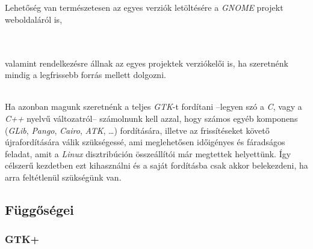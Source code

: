 \\
\\

Lehetőség van természetesen az egyes verziók letöltésére a \textit{GNOME} projekt weboldaláról is,

\\
\\

valamint rendelkezésre állnak az egyes projektek verziókelői is, ha szeretnénk mindig a legfrissebb forrás mellett dolgozni.

\\

Ha azonban magunk szeretnénk a teljes \textit{GTK}-t fordítani --legyen szó a \textit{C}, vagy a \textit{C++} nyelvű változatról-- számolnunk kell azzal, hogy számos egyéb komponens (\textit{GLib}, \textit{Pango}, \textit{Cairo}, \textit{ATK}, \dots) fordítására, illetve az frissítéseket követő újrafordítására válik szükségessé, ami meglehetősen időigényes és fáradságos feladat, amit a \textit{Linux} disztribúción összeállítói már megtettek helyettünk. Így célszerű kezdetben ezt kihasználni és a saját fordításba csak akkor belekezdeni, ha arra feltétlenül szükségünk van.

\subsection{Függőségei}

\subsubsection{GTK+}


%
%
%
%
%
%
%
%
%

